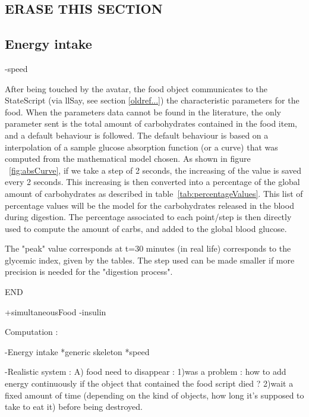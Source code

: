 
\subsection{ERASE THIS SECTION}


\subsection{Energy intake}
-speed

After being touched by the avatar, the food object communicates to the StateScript (via llSay, see section \ref{oldref...}) the characteristic parameters for the food. When the parameters data cannot be found in the literature, the only parameter sent is the total amount of carbohydrates contained in the food item, and a default behaviour is followed. The default behaviour is based on a interpolation of a sample glucose absorption function (or a curve) that was computed from the mathematical model chosen. As shown in figure ~\ref{fig:absCurve}, if we take a step of 2 seconds, the increasing of the value is saved every 2 seconds. This increasing is then converted into a percentage of the global amount of carbohydrates as described in table~\ref{tab:percentageValues}. This list of percentage values will be the model for the carbohydrates released in the blood during digestion. 
The percentage associated to each point/step is then directly used to compute the amount of carbs, and added to the global blood glucose. 

The "peak" value corresponds at t=30 minutes (in real life) corresponds to the glycemic index, given by the tables. 
The step used can be made smaller if more precision is needed for the "digestion process".

END

\iffalse

+simultaneousFood
-insulin


Computation : 
 
-Energy intake
    *generic skeleton
    *speed
    
-Realistic system :
    A) food need to disappear : 
        1)was a problem : how to add energy continuously if the object that contained the food script died ? 
        2)wait a fixed amount of time (depending on the kind of objects, how long it's supposed to take to eat it) before being destroyed.
        
